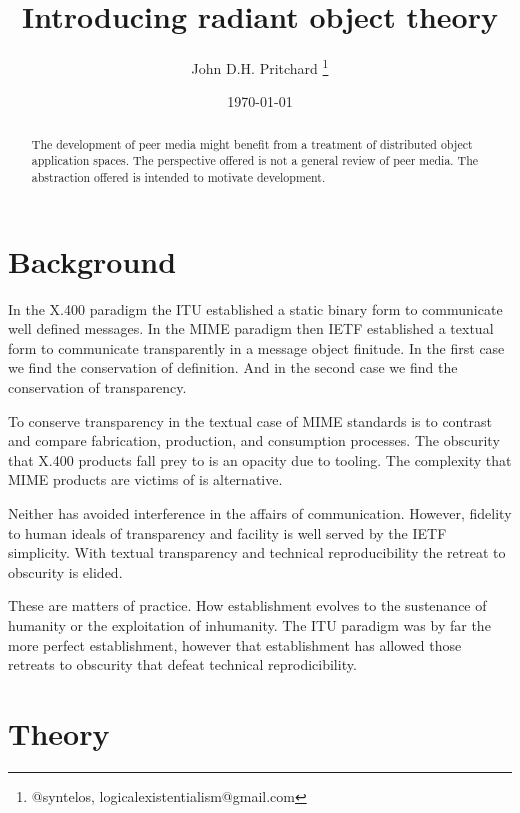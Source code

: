 \documentclass[12pt,twocolumn]{article}
\begin{document}
\title{Introducing radiant object theory}

\author{John D.H. Pritchard \thanks{@syntelos, logicalexistentialism@gmail.com}}

\date{\today}

\maketitle


\begin{abstract}

The development of peer media might benefit from a treatment of
distributed object application spaces.  The perspective offered is not
a general review of peer media.  The abstraction offered is intended
to motivate development.
  
\end{abstract}


\section{Background}

In the X.400 paradigm the ITU established a static binary form to
communicate well defined messages.  In the MIME paradigm then IETF
established a textual form to communicate transparently in a message
object finitude.  In the first case we find the conservation of
definition.  And in the second case we find the conservation of
transparency.  

To conserve transparency in the textual case of MIME standards is to
contrast and compare fabrication, production, and consumption
processes.  The obscurity that X.400 products fall prey to is an
opacity due to tooling.  The complexity that MIME products are victims
of is alternative.

Neither has avoided interference in the affairs of communication.
However, fidelity to human ideals of transparency and facility is well
served by the IETF simplicity.  With textual transparency and
technical reproducibility the retreat to obscurity is elided.

These are matters of practice.  How establishment evolves to the
sustenance of humanity or the exploitation of inhumanity.  The ITU
paradigm was by far the more perfect establishment, however that
establishment has allowed those retreats to obscurity that defeat
technical reprodicibility.

\section{Theory}
\end{document}
